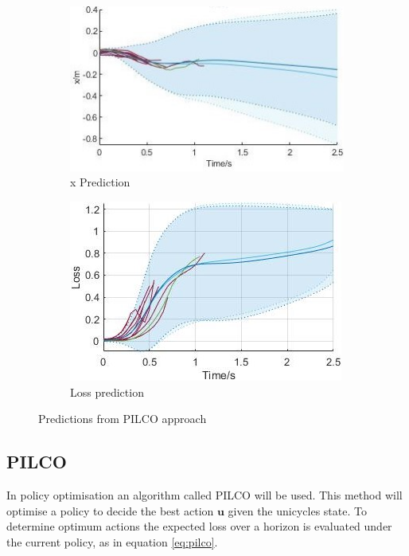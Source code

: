 \documentclass[twoside,twocolumn,12pt]{article}
\begin{document}
\begin{figure}[h]
  \centering
  \begin{subfigure}[t]{0.5\textwidth}
    \includegraphics[width=\linewidth]{u2}
  \caption{x Prediction} 
  \label{sub:ffffffs}
  \end{subfigure}
  \begin{subfigure}[t]{0.5\textwidth}
    \includegraphics[width=\linewidth]{loss2}
  \caption{Loss prediction}
  \label{sub:ffs}
  \end{subfigure}
  \caption{Predictions from PILCO approach}
  \label{fig:pilco}
\end{figure}

\subsection{PILCO}
In policy optimisation an algorithm called PILCO \cite{pilco} will be used.
This method will optimise a policy to decide the best action $\textbf{u}$ given the unicycles state. To determine optimum actions the expected loss over a horizon is evaluated under the current policy, as in equation \ref{eq:pilco}.
\end{document}
